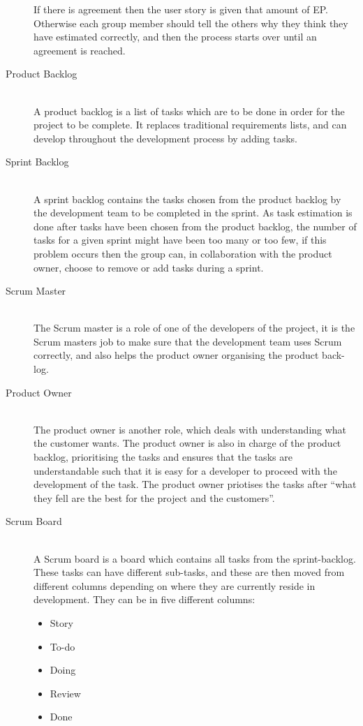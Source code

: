 \begin{description}
	If there is agreement then the user story is given that amount of EP.
	Otherwise each group member should tell the others why they think they have estimated correctly, and then the process starts over until an agreement is reached.
	\item[Product Backlog] \hfill \\
	A product backlog is a list of tasks which are to be done in order for the project to be complete.
	It replaces traditional requirements lists, and can develop throughout the development process by adding tasks.
	\item[Sprint Backlog] \hfill \\
	A sprint backlog contains the tasks chosen from the product backlog by the development team to be completed in the sprint.
	As task estimation is done after tasks have been chosen from the product backlog, the number of tasks for a given sprint might have been too many or too few, if this problem occurs then the group can, in collaboration with the product owner, choose to remove or add tasks during a sprint.
	\item[Scrum Master] \hfill \\
	The Scrum master is a role of one of the developers of the project, it is the Scrum masters job to make sure that the development team uses Scrum correctly, and also helps the product owner organising the product back-log.
	\item[Product Owner] \hfill \\
	The product owner is another role, which deals with understanding what the customer wants.
	The product owner is also in charge of the product backlog, prioritising the tasks and ensures that the tasks are understandable such that it is easy for a developer to proceed with the development of the task.
	The product owner priotises the tasks after \enquote{what they fell are the best for the project and the customers}.
	\item[Scrum Board] \hfill \\
	A Scrum board is a board which contains all tasks from the sprint-backlog.
	These tasks can have different sub-tasks, and these are then moved from different columns depending on where they are currently reside in development.
	They can be in five different columns:
	\begin{multicols}{5}
		\begin{itemize}
		\item Story
		\item To-do
		\item Doing
		\item Review
		\item Done
	\end{itemize}
	\end{multicols}


\end{description}
